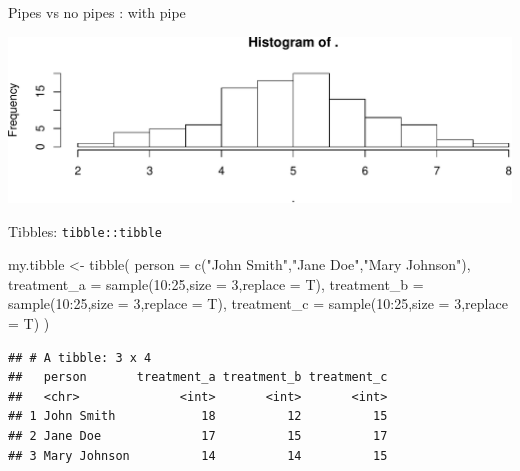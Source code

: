 \documentclass[14pt,ignorenonframetext,]{bredelebeamer}
\newenvironment{Shaded}{\begin{snugshade}}{\end{snugshade}}
\newcommand{\KeywordTok}[1]{\textcolor[rgb]{0.94,0.87,0.69}{#1}}
\newcommand{\DataTypeTok}[1]{\textcolor[rgb]{0.87,0.87,0.75}{#1}}
\newcommand{\DecValTok}[1]{\textcolor[rgb]{0.86,0.86,0.80}{#1}}
\newcommand{\StringTok}[1]{\textcolor[rgb]{0.80,0.58,0.58}{#1}}
\newcommand{\OperatorTok}[1]{\textcolor[rgb]{0.94,0.94,0.82}{#1}}
\newcommand{\NormalTok}[1]{\textcolor[rgb]{0.80,0.80,0.80}{#1}}
\begin{document}
\begin{frame}[fragile]{Pipes vs no pipes : with pipe}

\begin{Shaded}
\end{Shaded}

\includegraphics{tidyverse_28_03_files/figure-beamer/unnamed-chunk-11-1.pdf}

\end{frame}

\begin{frame}[fragile]{Tibbles: \texttt{tibble::tibble}}

\begin{Shaded}
\begin{Highlighting}[]
\NormalTok{my.tibble <-}\StringTok{ }\KeywordTok{tibble}\NormalTok{(}
    \DataTypeTok{person =} \KeywordTok{c}\NormalTok{(}\StringTok{"John Smith"}\NormalTok{,}\StringTok{"Jane Doe"}\NormalTok{,}\StringTok{"Mary Johnson"}\NormalTok{),}
    \DataTypeTok{treatment_a =} \KeywordTok{sample}\NormalTok{(}\DecValTok{10}\OperatorTok{:}\DecValTok{25}\NormalTok{,}\DataTypeTok{size =} \DecValTok{3}\NormalTok{,}\DataTypeTok{replace =}\NormalTok{ T),}
    \DataTypeTok{treatment_b =} \KeywordTok{sample}\NormalTok{(}\DecValTok{10}\OperatorTok{:}\DecValTok{25}\NormalTok{,}\DataTypeTok{size =} \DecValTok{3}\NormalTok{,}\DataTypeTok{replace =}\NormalTok{ T),}
    \DataTypeTok{treatment_c =} \KeywordTok{sample}\NormalTok{(}\DecValTok{10}\OperatorTok{:}\DecValTok{25}\NormalTok{,}\DataTypeTok{size =} \DecValTok{3}\NormalTok{,}\DataTypeTok{replace =}\NormalTok{ T)}
\NormalTok{)}
\end{Highlighting}
\end{Shaded}

\begin{verbatim}
## # A tibble: 3 x 4
##   person       treatment_a treatment_b treatment_c
##   <chr>              <int>       <int>       <int>
## 1 John Smith            18          12          15
## 2 Jane Doe              17          15          17
## 3 Mary Johnson          14          14          15
\end{verbatim}

\end{frame}
\end{document}
